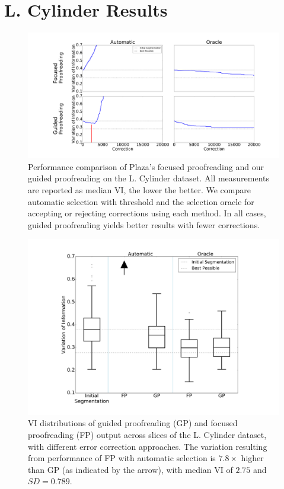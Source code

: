 \section{L. Cylinder Results}

\begin{figure}[t]
\centering
\includegraphics[width=\linewidth]{gfx/cyltrails.pdf}
\caption{Performance comparison of Plaza's focused proofreading and our guided proofreading on the L. Cylinder dataset. All measurements are reported as median VI, the lower the better. We compare automatic selection with threshold and the selection oracle for accepting or rejecting corrections using each method. In all cases, guided proofreading yields better results with fewer corrections.}
\label{fig:cylboxplot}
\end{figure}

\begin{figure}[t]
\centering
\includegraphics[width=.7\linewidth]{gfx/cylboxplot.pdf}
\caption{VI distributions of guided proofreading (GP) and focused proofreading (FP) output across slices of the L. Cylinder dataset, with different error correction approaches. The variation resulting from performance of FP with automatic selection is $7.8\times$ higher than GP (as indicated by the arrow), with median VI of $2.75$ and $SD=0.789$.}
\label{fig:cylboxplot}
\end{figure}


    
    